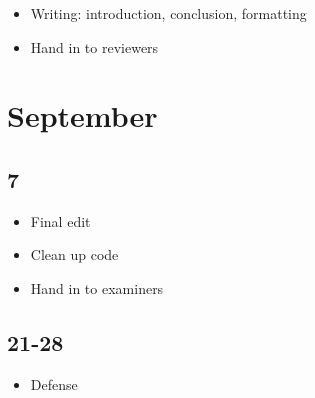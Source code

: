 \documentclass{article}
\begin{document}
\begin{itemize}
	\item Writing: introduction, conclusion, formatting
	\item Hand in to reviewers
\end{itemize}


\section*{September}

\subsection*{7}

\begin{itemize}
	\item Final edit
	\item Clean up code
	\item Hand in to examiners
\end{itemize}
	
\subsection*{21-28}

\begin{itemize}
	\item Defense
\end{itemize}
	
	
\end{document}

